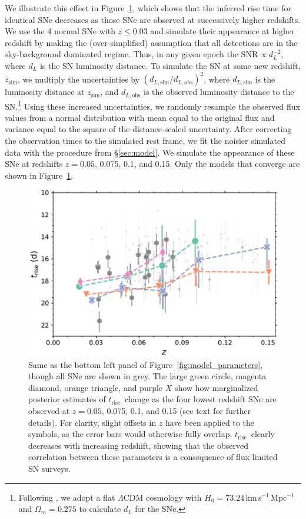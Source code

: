 \documentclass[twocolumn]{./aastex63}
\newcommand{\trise}{$t_\mathrm{rise}$}
\begin{document}
We illustrate this effect in Figure~\ref{fig:high_z_systematic}, which shows
that the inferred rise time for identical SNe decreases as those SNe are
observed at successively higher redshifts. We use the 4 normal SNe with $z \le
0.03$ and simulate their appearance at higher redshift by making the
(over-simplified) assumption that all detections are in the sky-background
dominated regime. Thus, in any given epoch the $\mathrm{SNR} \propto
d_L^{-2}$, where $d_L$ is the SN luminosity distance. To simulate the SN at
some new redshift, $z_\mathrm{sim}$, we multiply the uncertainties by
$(d_{L,\mathrm{sim}}/d_{L,\mathrm{obs}})^2$, where $d_{L,\mathrm{sim}}$ is the
luminosity distance at $z_\mathrm{sim}$, and $d_{L,\mathrm{obs}}$ is the
observed luminosity distance to the SN.\footnote{Following \citet{Yao19}, we
adopt a flat $\Lambda$CDM cosmology with $H_0 =
73.24$\,km\,s$^{-1}$\,Mpc$^{-1}$ \citep{Riess16} and $\Omega_m = 0.275$
\citep{Amanullah10} to calculate $d_L$ for the SNe.} Using these increased
uncertainties, we randomly resample the observed flux values from a normal
distribution with mean equal to the original flux and variance equal to the
square of the distance-scaled uncertainty. After correcting the observation
times to the simulated rest frame, we fit the noisier simulated data with the
procedure from \S\ref{sec:model}. We simulate the appearance of these SNe at
redshifts $z = 0.05$, 0.075, 0.1, and 0.15. Only the models that converge are
shown in Figure~\ref{fig:high_z_systematic}.

\begin{figure}
    \centering
    \includegraphics[width=1\linewidth]{./figures/high_z_systematic.pdf}
    \caption{Same as the bottom left panel of
    Figure~\ref{fig:model_parameters}, though all SNe are shown in grey. The
    large green circle, magenta diamond, orange triangle, and purple $X$ show
    how marginalized posterior estimates of \trise\ change as the four lowest
    redshift SNe are observed at $z = 0.05$, 0.075, 0.1, and 0.15 (see text
    for further details). For clarity, slight offsets in $z$ have been applied
    to the symbols, as the error bars would otherwise fully overlap. \trise\
    clearly decreases with increasing redshift, showing that the observed
    correlation between these parameters is a consequence of flux-limited SN
    surveys.}
    \label{fig:high_z_systematic}
\end{figure}
\end{document}
